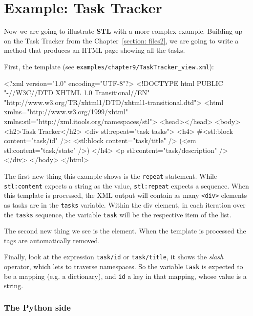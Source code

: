 \section{Example: Task Tracker}

Now we are going to illustrate {\bf STL} with a more complex example.
Building up on the Task Tracker from the Chapter~\ref{section: files2},
we are going to write a method that produces an HTML page showing all
the tasks.

First, the template (see {\tt examples/chapter9/TaskTracker\_view.xml}):

\begin{code}
    <?xml version="1.0" encoding="UTF-8"?>
    <!DOCTYPE html
         PUBLIC "-//W3C//DTD XHTML 1.0 Transitional//EN"
         "http://www.w3.org/TR/xhtml1/DTD/xhtml1-transitional.dtd">
    <html xmlns="http://www.w3.org/1999/xhtml"
          xmlns:stl="http://xml.itools.org/namespaces/stl">
      <head></head>
      <body>
        <h2>Task Tracker</h2>
        <div stl:repeat="task tasks">
          <h4>
            #<stl:block content="task/id" />:
            <stl:block content="task/title" />
            (<em stl:content="task/state" />)
          </h4>
          <p stl:content="task/description" />
        </div>
      </body>
    </html>
\end{code}

The first new thing this example shows is the {\tt repeat} statement. While
{\tt stl:content} expects a string as the value, {\tt stl:repeat} expects a
sequence. When this template is processed, the XML output will contain as
many {\tt <div>} elements as tasks are in the {\tt tasks} variable. Within
the div element, in each iteration over the {\tt tasks} sequence, the
variable {\tt task} will be the respective item of the list.

The second new thing we see is the {\tt <stl:block>} element. When the
template is processed the {\tt <stl:block>} tags are automatically
removed.

Finally, look at the expression {\tt task/id} or {\tt task/title}, it shows
the {\em slash} operator, which lets to traverse namespaces. So the variable
{\tt task} is expected to be a mapping (e.g. a dictionary), and
{\tt id} a key in that mapping, whose value is a string.

\subsubsection{The Python side}

